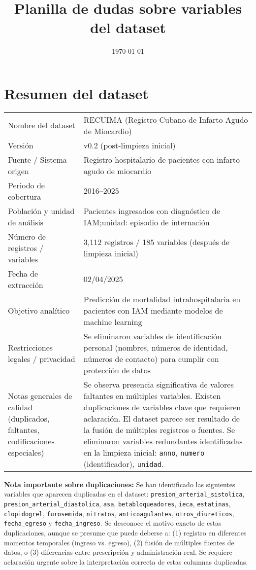 \documentclass[11pt,a4paper]{article}
\title{Planilla de dudas sobre variables del dataset}
\author{\Responsable}
\date{\today}
\newcommand{\DatasetNombre}{RECUIMA (Registro Cubano de Infarto Agudo de Miocardio)}
\newcommand{\DatasetVersion}{v0.2 (post-limpieza inicial)}
\begin{document}
\maketitle

\section*{Resumen del dataset}
\small
\setlength{\tabcolsep}{3pt}
\begin{tabular}{@{}L{0.28\textwidth} L{0.68\textwidth}@{}}
\toprule
Nombre del dataset & \DatasetNombre \\
Versión & \DatasetVersion \\
Fuente / Sistema origen & Registro hospitalario de pacientes con infarto agudo de miocardio \\
Periodo de cobertura & 2016--2025 \\
Población y unidad de análisis & Pacientes ingresados con diagnóstico de IAM;unidad: episodio de internación \\
Número de registros / variables & 3,112 registros / 185 variables (después de limpieza inicial) \\
Fecha de extracción & 02/04/2025 \\
Objetivo analítico & Predicción de mortalidad intrahospitalaria en pacientes con IAM mediante modelos de machine learning \\
Restricciones legales / privacidad & Se eliminaron variables de identificación personal (nombres, números de identidad, números de contacto) para cumplir con protección de datos \\
Notas generales de calidad (duplicados, faltantes, codificaciones especiales) & Se observa presencia significativa de valores faltantes en múltiples variables. Existen duplicaciones de variables clave que requieren aclaración. El dataset parece ser resultado de la fusión de múltiples registros o fuentes. Se eliminaron variables redundantes identificadas en la limpieza inicial: \texttt{anno}, \texttt{numero} (identificador), \texttt{unidad}. \\
\bottomrule
\end{tabular}

\vspace{1em}
\noindent\textbf{Nota importante sobre duplicaciones:} Se han identificado las siguientes variables que aparecen duplicadas en el dataset: \texttt{presion\_arterial\_sistolica}, \texttt{presion\_arterial\_diastolica}, \texttt{asa}, \texttt{betabloqueadores}, \texttt{ieca}, \texttt{estatinas}, \texttt{clopidogrel}, \texttt{furosemida}, \texttt{nitratos}, \texttt{anticoagulantes}, \texttt{otros\_diureticos}, \texttt{fecha\_egreso} y \texttt{fecha\_ingreso}. Se desconoce el motivo exacto de estas duplicaciones, aunque se presume que puede deberse a: (1) registro en diferentes momentos temporales (ingreso vs. egreso), (2) fusión de múltiples fuentes de datos, o (3) diferencias entre prescripción y administración real. Se requiere aclaración urgente sobre la interpretación correcta de estas columnas duplicadas.
\end{document}
